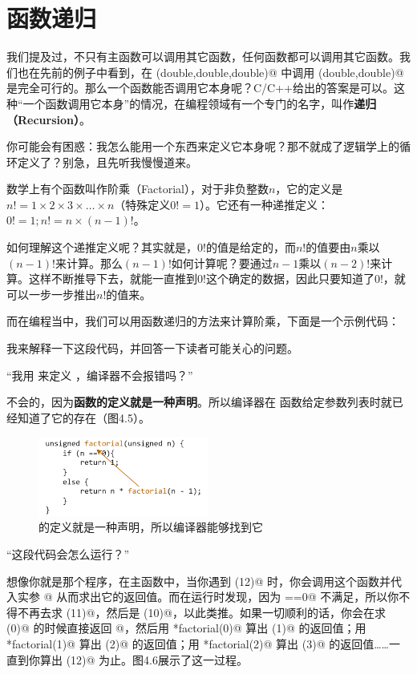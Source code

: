 \section{函数递归}
我们提及过，不只有主函数可以调用其它函数，任何函数都可以调用其它函数。我们也在先前的例子中看到，在 \lstinline@max(double,double,double)@ 中调用 \lstinline@max(double,double)@ 是完全可行的。那么一个函数能否调用它本身呢？C/C++给出的答案是可以。这种``一个函数调用它本身''的情况，在编程领域有一个专门的名字，叫作\textbf{递归（Recursion）}。\par
你可能会有困惑：我怎么能用一个东西来定义它本身呢？那不就成了逻辑学上的循环定义了？别急，且先听我慢慢道来。\par
数学上有个函数叫作阶乘（Factorial），对于非负整数$n$，它的定义是$n!=1\times2\times3\times\ldots\times n$（特殊定义$0!=1$）。它还有一种递推定义：$0!=1; n!=n\times(n-1)!$。\par
如何理解这个递推定义呢？其实就是，$0!$的值是给定的，而$n!$的值要由$n$乘以$(n-1)!$来计算。那么$(n-1)!$如何计算呢？要通过$n-1$乘以$(n-2)!$来计算。这样不断推导下去，就能一直推到$0!$这个确定的数据，因此只要知道了$0!$，就可以一步一步推出$n!$的值来。\par
而在编程当中，我们可以用函数递归的方法来计算阶乘，下面是一个示例代码：

我来解释一下这段代码，并回答一下读者可能关心的问题。\par
{\kaishu ``我用 \lstinline@factorial@ 来定义 \lstinline@factorial@，编译器不会报错吗？''}\par
不会的，因为\textbf{函数的定义就是一种声明}。所以编译器在 \lstinline@factorial@ 函数给定参数列表时就已经知道了它的存在（图4.5）。\par
\begin{figure}[htbp]
    \centering
    \includegraphics[width=0.5\textwidth]{../images/generalized_parts/04_factorial_code_logic.png}
    \caption{\lstinline@factorial@ 的定义就是一种声明，所以编译器能够找到它}
\end{figure}
{\kaishu ``这段代码会怎么运行？''}\par
想像你就是那个程序，在主函数中，当你遇到 \lstinline@factorial(12)@ 时，你会调用这个函数并代入实参 @ 从而求出它的返回值。而在运行时发现，因为 \lstinline@n==0@ 不满足，所以你不得不再去求 \lstinline@factorial(11)@，然后是 \lstinline@factorial(10)@，以此类推。如果一切顺利的话，你会在求 \lstinline@factorial(0)@ 的时候直接返回 @，然后用 *factorial(0)@ 算出 \lstinline@factorial(1)@ 的返回值；用 *factorial(1)@ 算出 \lstinline@factorial(2)@ 的返回值；用 *factorial(2)@ 算出 \lstinline@factorial(3)@ 的返回值……一直到你算出 \lstinline@factorial(12)@ 为止。图4.6展示了这一过程。\par
